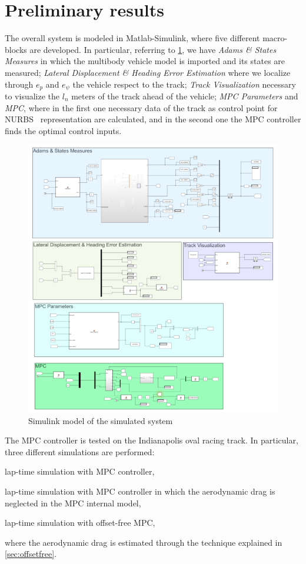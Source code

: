\documentclass[conference]{IEEEtran} %
\begin{document}
\section{Preliminary results}
The overall system is modeled in Matlab-Simulink, where five different macro-blocks are developed. In particular, referring to \ref{fig:simulink_blocks}, we have \textit{Adams \& States Measures} in which the multibody vehicle model is imported and its states are measured; \textit{Lateral Displacement \& Heading Error Estimation} where we localize through $e_p$ and $e_\psi$ the vehicle respect to the track; \textit{Track Visualization} necessary to visualize the $l_n$ meters of the track ahead of the vehicle; \textit{MPC Parameters} and \textit{MPC}, where in the first one necessary data of the track as control point for NURBS~\cite{nurbs} representation are calculated, and in the second one the MPC controller finds the optimal control inputs.
\begin{figure}[htb] \centering
	\includegraphics[width=1.\linewidth]{simulink_blocks}
	\caption{Simulink model of the simulated system}
	\label{fig:simulink_blocks}
\end{figure}
The MPC controller is tested on the Indianapolis oval racing track. In particular, three different simulations are performed:
\begin{enumerate*}[label=(\roman*)]
	\item lap-time simulation with MPC controller,
	\item lap-time simulation with MPC controller in which the aerodynamic drag is neglected in the MPC internal model,
	\item lap-time simulation with offset-free MPC,
\end{enumerate*}
where the aerodynamic drag is estimated through the technique explained in \ref{sec:offsetfree}.
\end{document}
